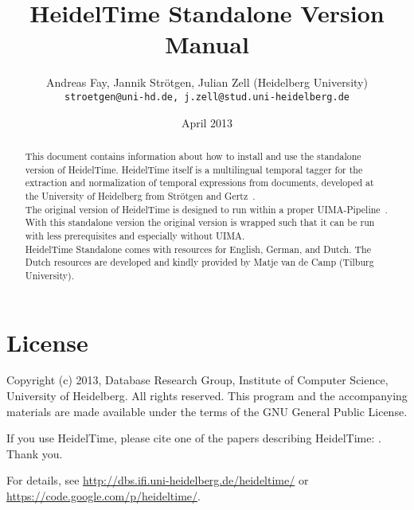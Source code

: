 \documentclass[
     11pt,         %
     a4paper,      %
     oneside,
     ]{article}
\begin{document}
\title{%
HeidelTime Standalone Version\\
Manual
}
\author{Andreas Fay, Jannik Str\"otgen, Julian Zell (Heidelberg University)\\[0.2em]
\small \texttt{stroetgen@uni-hd.de, j.zell@stud.uni-heidelberg.de}
}
\date{April 2013}
\maketitle

\begin{abstract}
This document contains information about how to install and use the standalone version of HeidelTime. HeidelTime itself is a multilingual temporal tagger for the extraction and normalization of temporal expressions from documents, developed at the University of Heidelberg from Str\"otgen and Gertz~\cite{Strotgen2010, HeidelTime, StroetgenGertz2012}.\\
The original version of HeidelTime is designed to run within a proper UIMA-Pipeline~\cite{UIMA}. With this standalone version the original version is wrapped such that it can be run with less prerequisites and especially without UIMA.\\
HeidelTime Standalone comes with resources for English, German, and Dutch. The Dutch resources are developed and kindly provided by Matje van de Camp (Tilburg University)\cite{Matje}.
\end{abstract}

\tableofcontents

%




\section{License}
Copyright (c) 2013, Database Research Group, Institute of Computer Science, University of Heidelberg. 
All rights reserved. This program and the accompanying materials 
are made available under the terms of the GNU General Public License.

If you use HeidelTime, please cite one of the papers describing HeidelTime: \cite{Strotgen2010, StroetgenGertz2012}. Thank you.

For details, see \url{http://dbs.ifi.uni-heidelberg.de/heideltime/} or \\
\url{https://code.google.com/p/heideltime/}.







\end{document}
